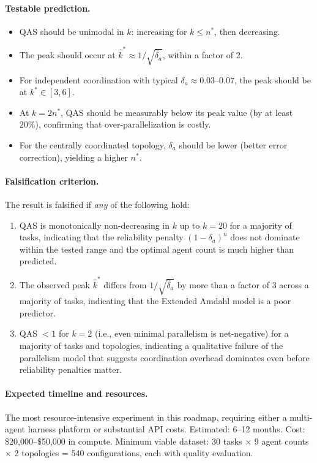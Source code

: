 \documentclass[11pt, a4paper]{googledeepmind}
\begin{document}
\paragraph{Testable prediction.}
\begin{itemize}[nosep]
    \item QAS should be unimodal in $k$: increasing for $k \leq n^*$, then decreasing.
    \item The peak should occur at $\hat{k}^* \approx 1/\sqrt{\hat{\delta}_a}$, within a factor of 2.
    \item For independent coordination with typical $\delta_a \approx 0.03$--$0.07$, the peak should be at $k^* \in [3, 6]$.
    \item At $k = 2n^*$, QAS should be measurably below its peak value (by at least 20\%), confirming that over-parallelization is costly.
    \item For the centrally coordinated topology, $\delta_a$ should be lower (better error correction), yielding a higher $n^*$.
\end{itemize}

\paragraph{Falsification criterion.} The result is falsified if \emph{any} of the following hold:
\begin{enumerate}[nosep]
    \item QAS is monotonically non-decreasing in $k$ up to $k = 20$ for a majority of tasks, indicating that the reliability penalty $(1-\delta_a)^n$ does not dominate within the tested range and the optimal agent count is much higher than predicted.
    \item The observed peak $\hat{k}^*$ differs from $1/\sqrt{\hat{\delta}_a}$ by more than a factor of 3 across a majority of tasks, indicating that the Extended Amdahl model is a poor predictor.
    \item QAS $< 1$ for $k = 2$ (i.e., even minimal parallelism is net-negative) for a majority of tasks and topologies, indicating a qualitative failure of the parallelism model that suggests coordination overhead dominates even before reliability penalties matter.
\end{enumerate}

\paragraph{Expected timeline and resources.} The most resource-intensive experiment in this roadmap, requiring either a multi-agent harness platform or substantial API costs. Estimated: 6--12 months. Cost: \$20,000--\$50,000 in compute. Minimum viable dataset: 30 tasks $\times$ 9 agent counts $\times$ 2 topologies = 540 configurations, each with quality evaluation.
\end{document}
